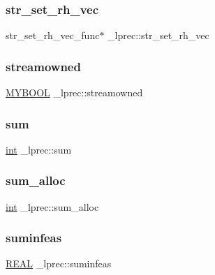 \subsubsection{\texorpdfstring{str\+\_\+set\+\_\+rh\+\_\+vec}{str\_set\_rh\_vec}}
{\footnotesize\ttfamily str\+\_\+set\+\_\+rh\+\_\+vec\+\_\+func$\ast$ \+\_\+lprec\+::str\+\_\+set\+\_\+rh\+\_\+vec}

\mbox{\label{struct__lprec_a79186ec76db2a9bb2425292b3837e1b3}} 
\subsubsection{\texorpdfstring{streamowned}{streamowned}}
{\footnotesize\ttfamily \hyperlink{lp__lib_8h_aad848328fb3018217ac9f01d97b6bd88}{M\+Y\+B\+O\+OL} \+\_\+lprec\+::streamowned}

\mbox{\label{struct__lprec_a5914de6f675046a8cf948c3183ecb147}} 
\subsubsection{\texorpdfstring{sum}{sum}}
{\footnotesize\ttfamily \hyperlink{lp__lib_8h_adeb9ec6400320e4923ac9d836d509ddb}{int} \+\_\+lprec\+::sum}

\mbox{\label{struct__lprec_ae090d9c999e5cefb6d56896d59fafdd8}} 
\subsubsection{\texorpdfstring{sum\+\_\+alloc}{sum\_alloc}}
{\footnotesize\ttfamily \hyperlink{lp__lib_8h_adeb9ec6400320e4923ac9d836d509ddb}{int} \+\_\+lprec\+::sum\+\_\+alloc}

\mbox{\label{struct__lprec_a05c98b5e2a1a6a6f3182f16d911bfb29}} 
\subsubsection{\texorpdfstring{suminfeas}{suminfeas}}
{\footnotesize\ttfamily \hyperlink{lp__lib_8h_a92bd5e363d131fa73669358edb232dce}{R\+E\+AL} \+\_\+lprec\+::suminfeas}

